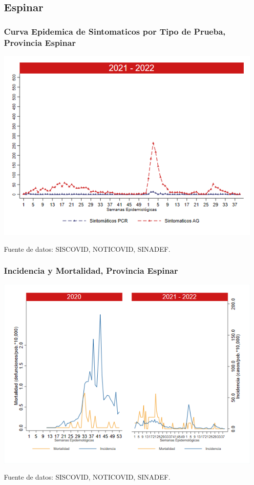 \documentclass[xcolor=table]{beamer}
\begin{document}
\subsection{Espinar}
\begin{frame}[label=Espinar]
	\frametitle{Curva Epidemica de Sintomaticos por Tipo de Prueba, Provincia Espinar}
	\vspace{-.5cm}
	\begin{center}
		\includegraphics[width=0.8\linewidth, trim={0cm .5cm 0cm 0.2cm},clip]{../figuras/sinto_prueba20_21_8.png}
	\end{center}
	{\tiny Fuente de datos: SISCOVID, NOTICOVID, SINADEF.}
	\hyperlink{TipoPrueba}{}
\end{frame}

\begin{frame}[label=Espinar]
	\frametitle{Incidencia y Mortalidad, Provincia Espinar}
	\vspace{-.5cm}
	\begin{center}
		\includegraphics[width=0.8\linewidth, trim={0cm .5cm 0cm 0.2cm},clip]{../figuras/incidencia_mortalidad_20_21_8.png}
	\end{center}
	{\tiny Fuente de datos: SISCOVID, NOTICOVID, SINADEF.}
\end{frame}
\end{document}

